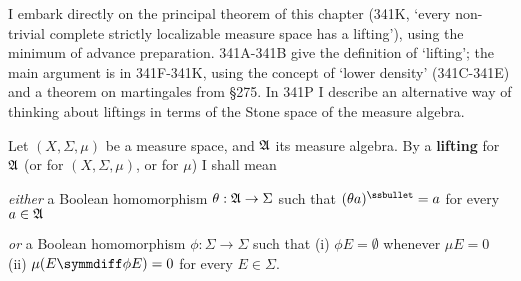 
\def\chaptername{Liftings}
\def\sectionname{The lifting theorem}


I embark directly on the principal theorem of this chapter (341K, `every
non-trivial complete strictly localizable measure space has a lifting'),
using the minimum of advance preparation.   341A-341B give the
definition
of `lifting';  the main argument is in 341F-341K, using the concept of
`lower density' (341C-341E) and a theorem on martingales from \S275.
In 341P I describe an alternative way of thinking about liftings in
terms of the Stone space of the measure algebra.

 Let $(X,\Sigma,\mu)$ be a measure space,
and $\frak A$ its measure algebra.   By a {\bf lifting} for $\frak A$ (or
for $(X,\Sigma,\mu)$, or for $\mu$) I shall mean

{\it either} a Boolean homomorphism $\theta:\frak A\to\Sigma$ such that
$(\theta a)^{\ssbullet}=a$ for every $a\in\frak A$

{\it or} a Boolean homomorphism $\phi:\Sigma\to\Sigma$ such that (i)
$\phi E=\emptyset$ whenever $\mu E=0$ (ii) $\mu(E\symmdiff\phi E)=0$ for
every $E\in\Sigma$.

